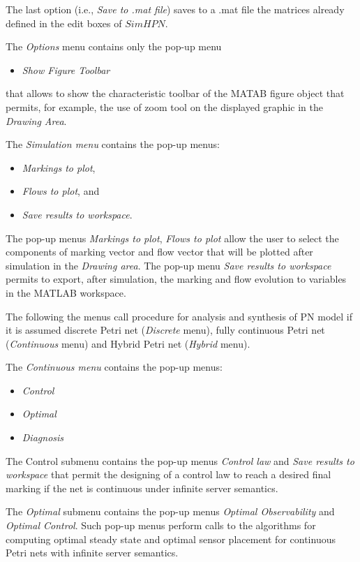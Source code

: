 The last option (i.e., \emph{Save to .mat file}) saves to a .mat file the matrices already defined in the edit boxes of $SimHPN$.

The {\color{blue}\emph{Options}} menu contains only the pop-up menu 
\begin{itemize}
\item \emph{Show Figure Toolbar} 
\end{itemize}
that allows to show the characteristic toolbar of the MATAB figure object that permits, for example, the use of zoom tool on the displayed graphic in the \emph{Drawing Area}.

The {\color{blue}\emph{Simulation menu}} contains the pop-up menus: 
\begin{itemize}
\item \emph{Markings to plot}, 
\item \emph{Flows to plot}, and 
\item \emph{Save results to workspace}. 
\end{itemize}
The pop-up menus \emph{Markings to plot}, \emph{Flows to plot} allow the user to select the components of marking vector and flow vector that will be plotted after  simulation in the \emph{Drawing area}. The pop-up menu \emph{Save results to workspace}  permits to export, after simulation, the marking and flow evolution to variables in the MATLAB workspace.

The following the menus call procedure for analysis and synthesis of PN model if it is assumed discrete Petri net (\emph{Discrete} menu), fully continuous Petri net (\emph{Continuous} menu) and Hybrid Petri net (\emph{Hybrid} menu).

The {\color{blue}\emph{Continuous menu}} contains the pop-up menus:
\begin{itemize}
\item \emph{Control}
\item \emph{Optimal}
\item \emph{Diagnosis}
\end{itemize} 

The Control submenu contains the pop-up menus \emph{Control law} and \emph{Save results to workspace} that permit the designing of a control law to reach a desired final marking if the net is continuous under infinite server semantics. 

The \emph{Optimal} submenu contains the pop-up menus \emph{Optimal Observability} and \emph{Optimal Control}. Such pop-up menus perform calls to the algorithms for computing optimal steady state and optimal sensor placement for continuous Petri nets with infinite server semantics.

